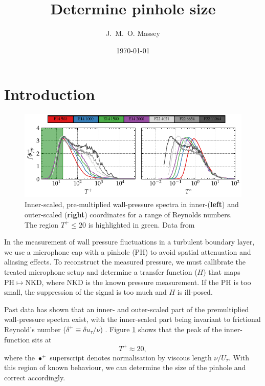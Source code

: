 \documentclass[11pt,a4paper]{article}
\title{Determine pinhole size}
\author{J.~M.~O. Massey}
\date{\today}
\begin{document}
\maketitle
\section{Introduction}

    \begin{figure}
        \centering
        \includegraphics{figures/1_bl.pdf}
        \caption{Inner-scaled, pre-multiplied wall-pressure spectra in inner-(\textbf{left}) and outer-scaled (\textbf{right}) coordinates for a range of Reynolds numbers. The region $T^+\leq 20$ is highlighted in green. Data from \citet{eitel-amor_simulation_2014,fritsch_pressure_2020,fritsch_fluctuating_2022}}
    \label{fig:bl_spectra}
    \end{figure}

    In the measurement of wall pressure fluctuations in a turbulent boundary layer, we use a microphone cap with a pinhole (PH) to avoid spatial attenuation and aliasing effects. To reconstruct the measured pressure, we must callibrate the treated microphone setup and determine a transfer function ($H$) that maps $\mathrm{PH}\mapsto \mathrm{NKD}$, where NKD is the known pressure measurement. If the PH is too small, the suppression of the signal is too much and $H$ is ill-posed.

    Past data has shown that an inner- and outer-scaled part of the premultiplied wall-pressure spectra exist, with the inner-scaled part being invariant to frictional Reynold's number ($\delta^+\equiv \delta u_\tau / \nu$) \citep{massey_eddy_2025}. Figure \ref{fig:bl_spectra} shows that the peak of the inner-function sits at
    \begin{equation}
        T^+\approx 20 ,
    \label{eq: temporal filter}
    \end{equation}
    where the $\bullet^+$ superscript denotes normalisation by viscous length $\nu/U_\tau$. With this region of known behaviour, we can determine the size of the pinhole and correct accordingly.
\end{document}
